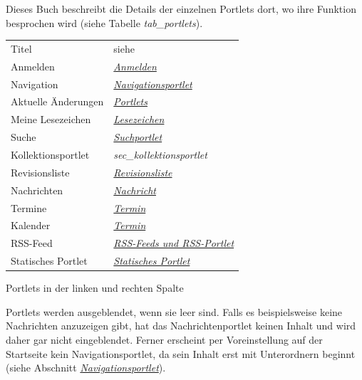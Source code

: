 \documentclass[a4paper,12pt,ngerman]{manual}
\begin{document}
Dieses Buch beschreibt die Details der einzelnen Portlets dort, wo ihre
Funktion besprochen wird (siehe Tabelle \emph{tab\_portlets}).
\hypertarget{tab-portlets}{}
\begin{tabulary}{\textwidth}{|L|L|}
\hline

Titel
 & 
siehe
\\

Anmelden
 & 
\hyperlink{sec-anmelden}{\emph{Anmelden}}
\\

Navigation
 & 
\hyperlink{sec-navigation-portlet}{\emph{Navigationsportlet}}
\\

Aktuelle
Änderungen
 & 
\hyperlink{sec-nutz-von-metad-3}{\emph{Portlets}}
\\

Meine
Lesezeichen
 & 
\hyperlink{sec-navigation-lesezeichen}{\emph{Lesezeichen}}
\\

Suche
 & 
\hyperlink{sec-suchportlet}{\emph{Suchportlet}}
\\

Kollektionsportlet
 & 
\emph{sec\_kollektionsportlet}
\\

Revisionsliste
 & 
\hyperlink{sec-revisionsliste}{\emph{Revisionsliste}}
\\

Nachrichten
 & 
\hyperlink{sec-nachricht}{\emph{Nachricht}}
\\

Termine
 & 
\hyperlink{sec-termin}{\emph{Termin}}
\\

Kalender
 & 
\hyperlink{sec-termin}{\emph{Termin}}
\\

RSS-Feed
 & 
\hyperlink{sec-rss}{\emph{RSS-Feeds und RSS-Portlet}}
\\

Statisches
Portlet
 & 
\hyperlink{sec-statisches-portlet}{\emph{Statisches Portlet}}
\\
\hline
\end{tabulary}


Portlets in der linken und rechten Spalte

Portlets werden ausgeblendet, wenn sie leer sind. Falls es
beispielsweise keine Nachrichten anzuzeigen gibt, hat das
Nachrichtenportlet keinen Inhalt und wird daher gar nicht
eingeblendet. Ferner erscheint per Voreinstellung auf der Startseite
kein Navigationsportlet, da sein Inhalt erst mit Unterordnern beginnt
(siehe Abschnitt \hyperlink{sec-navigation-portlet}{\emph{Navigationsportlet}}).
\end{document}
